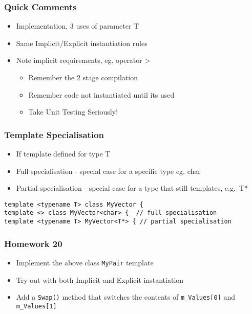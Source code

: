 \hypertarget{quick-comments}{%
\subsubsection{Quick Comments}\label{quick-comments}}

\begin{itemize}
\tightlist
\item
  Implementation, 3 uses of parameter T
\item
  Same Implicit/Explicit instantiation rules
\item
  Note implicit requirements, eg. operator \textgreater{}

  \begin{itemize}
  \tightlist
  \item
    Remember the 2 stage compilation
  \item
    Remember code not instantiated until its used
  \item
    Take Unit Testing Seriously!
  \end{itemize}
\end{itemize}

\hypertarget{template-specialisation}{%
\subsubsection{Template Specialisation}\label{template-specialisation}}

\begin{itemize}
\tightlist
\item
  If template defined for type T
\item
  Full specialisation - special case for a specific type eg. char
\item
  Partial specialisation - special case for a type that still templates,
  e.g.~T*
\end{itemize}

\begin{verbatim}
template <typename T> class MyVector {
template <> class MyVector<char> {  // full specialisation
template <typename T> MyVector<T*> { // partial specialisation
\end{verbatim}

\hypertarget{homework-20}{%
\subsubsection{Homework 20}\label{homework-20}}

\begin{itemize}
\tightlist
\item
  Implement the above class \texttt{MyPair} template
\item
  Try out with both Implicit and Explicit instantiation
\item
  Add a \texttt{Swap()} method that switches the contents of
  \texttt{m\_Values{[}0{]}} and \texttt{m\_Values{[}1{]}}
\end{itemize}
